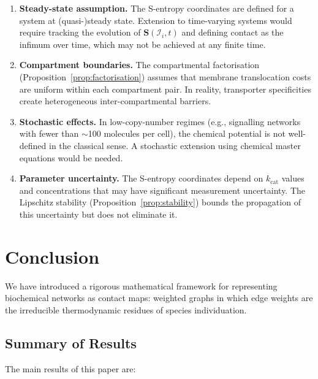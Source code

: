 \documentclass[11pt,twocolumn]{article}
\theoremstyle{plain}
\theoremstyle{definition}
\newcommand{\bS}{\mathbf{S}}
\begin{document}
\begin{enumerate}[label=(\roman*)]
\item \textbf{Steady-state assumption.} The S-entropy coordinates are defined
  for a system at (quasi-)steady state. Extension to time-varying systems would
  require tracking the evolution of $\bS(\mathcal{I}_i, t)$ and defining
  contact as the infimum over time, which may not be achieved at any finite time.

\item \textbf{Compartment boundaries.} The compartmental factorisation
  (Proposition~\ref{prop:factorisation}) assumes that membrane translocation
  costs are uniform within each compartment pair. In reality, transporter
  specificities create heterogeneous inter-compartmental barriers.

\item \textbf{Stochastic effects.} In low-copy-number regimes (e.g., signalling
  networks with fewer than $\sim$100 molecules per cell), the chemical potential
  is not well-defined in the classical sense. A stochastic extension using
  chemical master equations would be needed.

\item \textbf{Parameter uncertainty.} The S-entropy coordinates depend on
  $k_{\text{cat}}$ values and concentrations that may have significant
  measurement uncertainty. The Lipschitz stability
  (Proposition~\ref{prop:stability}) bounds the propagation of this uncertainty
  but does not eliminate it.
\end{enumerate}


\section{Conclusion}
\label{sec:conclusion}

We have introduced a rigorous mathematical framework for representing
biochemical networks as contact maps: weighted graphs in which edge weights are
the irreducible thermodynamic residues of species individuation.

\subsection{Summary of Results}

The main results of this paper are:
\end{document}
